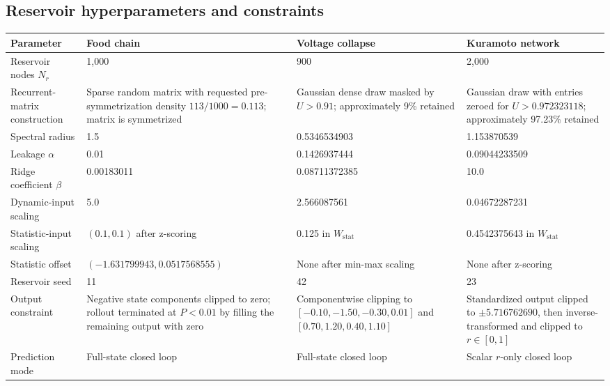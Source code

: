 \documentclass[10pt,a4paper]{article}
\begin{document}
\begin{landscape}
\section{Reservoir hyperparameters and constraints}

\centering
{}
\label{tab:hyperparameters}
\small
\begin{tabularx}{\linewidth}{L{41mm} Z Z Z}
\toprule
Parameter & Food chain & Voltage collapse & Kuramoto network \\
\midrule
Reservoir nodes $N_r$ & 1,000 & 900 & 2,000 \\
Recurrent-matrix construction
& Sparse random matrix with requested pre-symmetrization density $113/1000=0.113$; matrix is symmetrized
& Gaussian dense draw masked by $U>0.91$; approximately 9\% retained
& Gaussian draw with entries zeroed for $U>0.972323118$; approximately 97.23\% retained \\
Spectral radius & 1.5 & 0.5346534903 & 1.153870539 \\
Leakage $\alpha$ & 0.01 & 0.1426937444 & 0.09044233509 \\
Ridge coefficient $\beta$ & 0.00183011 & 0.08711372385 & 10.0 \\
Dynamic-input scaling & 5.0 & 2.566087561 & 0.04672287231 \\
Statistic-input scaling & $(0.1,0.1)$ after z-scoring & 0.125 in $W_{\mathrm{stat}}$ & 0.4542375643 in $W_{\mathrm{stat}}$ \\
Statistic offset & $(-1.631799943,0.0517568555)$ & None after min-max scaling & None after z-scoring \\
Reservoir seed & 11 & 42 & 23 \\
Output constraint
& Negative state components clipped to zero; rollout terminated at $P<0.01$ by filling the remaining output with zero
& Componentwise clipping to $[-0.10,-1.50,-0.30,0.01]$ and $[0.70,1.20,0.40,1.10]$
& Standardized output clipped to $\pm5.716762690$, then inverse-transformed and clipped to $r\in[0,1]$ \\
Prediction mode & Full-state closed loop & Full-state closed loop & Scalar $r$-only closed loop \\
\bottomrule
\end{tabularx}
\end{landscape}
\end{document}
